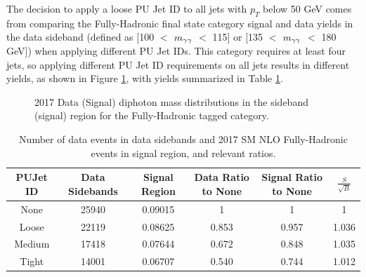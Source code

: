 The decision to apply a loose PU Jet ID to all jets with $p_{T}$ below 50 GeV comes from comparing the Fully-Hadronic final state category signal and data yields in the data sideband (defined as [100 $<$ $m_{\gamma\gamma}$ $<$ 115] or [135 $<$ $m_{\gamma\gamma}$ $<$ 180 GeV]) when applying
different PU Jet IDs. This category requires at least four jets, so applying different PU Jet ID requirements on all jets results in different yields, as shown in Figure \ref{fig:PUJetID},
with yields summarized in Table \ref{tab:PUJetIDYields}.

\begin{figure}[H]
    \setcounter{subfigure}{0}
    \centering
    \qquad
    \caption{2017 Data (Signal) diphoton mass distributions in the sideband (signal) region for the Fully-Hadronic tagged category.}
    \label{fig:PUJetID}
\end{figure}

\begin{table}[!htbp]
    \begin{center}
            \begin{tabular}{|c|c|c|c|c||c|}
                    \hline
                    PUJet ID & Data Sidebands & Signal Region & Data Ratio to None & Signal Ratio to None & $\frac{S}{\sqrt{B}}$\\
                    \hline
                    None & 25940 & 0.09015 & 1 & 1 & 1 \\
                    \hline
                    Loose & 22119 & 0.08625 & 0.853 & 0.957 & 1.036 \\
                    \hline
                    Medium & 17418 & 0.07644 & 0.672 & 0.848 & 1.035\\
                    \hline
                    Tight & 14001 & 0.06707 & 0.540 & 0.744 & 1.012\\
                    \hline
            \end{tabular}
    \end{center}
    \caption{Number of data events in data sidebands and 2017 SM NLO Fully-Hadronic events in signal region, and relevant ratios. \label{tab:PUJetIDYields}}
\end{table}

